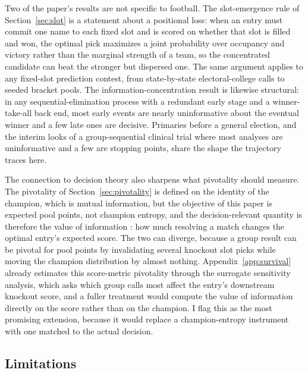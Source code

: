 \documentclass[11pt,letterpaper]{article}
\begin{document}
Two of the paper's results are not specific to football. The slot-emergence rule of Section~\ref{sec:slot} is a statement about a positional loss: when an entry must commit one name to each fixed slot and is scored on whether that slot is filled and won, the optimal pick maximizes a joint probability over occupancy and victory rather than the marginal strength of a team, so the concentrated candidate can beat the stronger but dispersed one. The same argument applies to any fixed-slot prediction contest, from state-by-state electoral-college calls to seeded bracket pools. The information-concentration result is likewise structural: in any sequential-elimination process with a redundant early stage and a winner-take-all back end, most early events are nearly uninformative about the eventual winner and a few late ones are decisive. Primaries before a general election, and the interim looks of a group-sequential clinical trial where most analyses are uninformative and a few are stopping points, share the shape the trajectory traces here.

The connection to decision theory also sharpens what pivotality should measure. The pivotality of Section~\ref{sec:pivotality} is defined on the identity of the champion, which is mutual information, but the objective of this paper is expected pool points, not champion entropy, and the decision-relevant quantity is therefore the value of information \citep{howard1966, raiffa1961}: how much resolving a match changes the optimal entry's expected score. The two can diverge, because a group result can be pivotal for pool points by invalidating several knockout slot picks while moving the champion distribution by almost nothing. Appendix~\ref{app:survival} already estimates this score-metric pivotality through the surrogate sensitivity analysis, which asks which group calls most affect the entry's downstream knockout score, and a fuller treatment would compute the value of information directly on the score rather than on the champion. I flag this as the most promising extension, because it would replace a champion-entropy instrument with one matched to the actual decision.

\subsection{Limitations}
\end{document}
